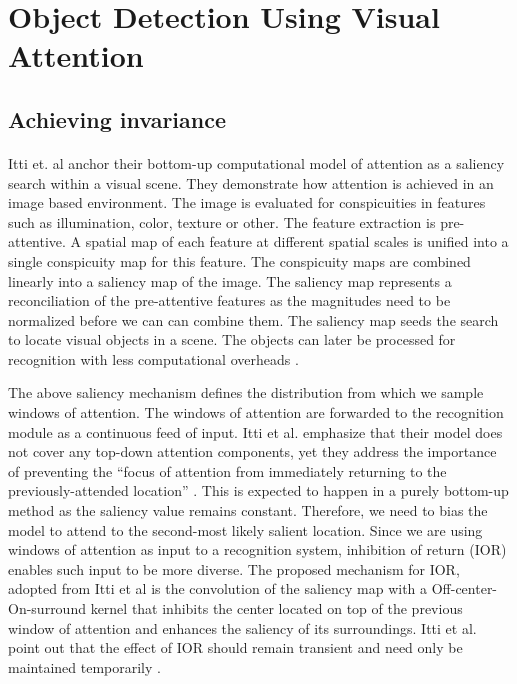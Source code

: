 \documentclass{report}
\begin{document}
\section{Object Detection Using Visual Attention}

\subsection{Achieving invariance}

\paragraph{}Itti et. al anchor their bottom-up computational model of attention as a saliency search within a visual scene. They demonstrate how attention is achieved in an image based environment. The image is evaluated for conspicuities in features such as illumination, color, texture or other. The feature extraction is pre-attentive. A spatial map of each feature at different spatial scales is unified into a single conspicuity map for this feature. The conspicuity maps are combined linearly into a saliency map of the image. The saliency map represents a reconciliation of the pre-attentive features as the magnitudes need to be normalized before we can can combine them. The saliency map seeds the search to locate visual objects in a scene. The objects can later be processed for recognition with less computational overheads \cite{Itti2000, Itti2001}.

The above saliency mechanism defines the distribution from which we sample windows of attention. The windows of attention are forwarded to the recognition module as a continuous feed of input. Itti et al. emphasize that their model does not cover any top-down attention components, yet they address the importance of preventing the "`focus of attention from immediately returning to the previously-attended location"' \cite{Itti2000}. This is expected to happen in a purely bottom-up method as the saliency value remains constant. Therefore, we need to bias the model to attend to the second-most likely salient location. Since we are using windows of attention as input to a recognition system, inhibition of return (IOR) enables such input to be more diverse. The proposed mechanism for IOR, adopted from Itti et al is the convolution of the saliency map with a Off-center-On-surround kernel that inhibits the center located on top of the previous window of attention and enhances the saliency of its surroundings. Itti et al. point out that the effect of IOR should remain transient and need only be maintained temporarily \cite{Itti2000}.
\end{document}
